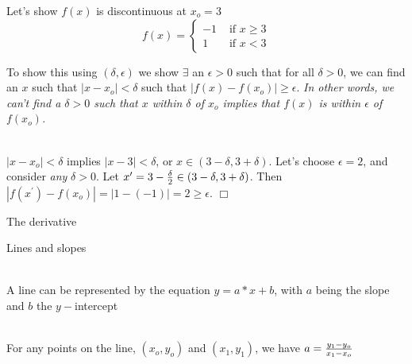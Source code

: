 \documentclass[10pt]{seminar}
\begin{document}
\newtheorem{proposition}{Proposition}

\newtheorem{definition}{Definition}

\newtheorem{corollary}{Corollary}

\newtheorem{theorem}{Theorem}

\newtheorem{lemma}{Lemma}

\def\argmax{\mathop{\rm argmax}\limits}  



\sffamily 

\begin{slide}

 
 Let's show $f(x)$ is discontinuous at $x_o=3$
\begin{equation*}
 f(x)=\left\{ 
 \begin{array}{cc}
-1&\text{ if }x\geq 3\\
1 &\text{ if }x<3
 \end{array}
\right.
\end{equation*}
 
To show this using $(\delta, \epsilon)$ we show $\exists$ an $\epsilon>0$ such that for all $\delta>0$, we can find an $x$ such that $|x-x_o|<\delta$ such that $|f(x)-f(x_o)|\geq\epsilon$.  \textit{In other words, we can't find a $\delta>0$ such that $x$ within $\delta$ of $x_o$ implies that $f(x)$ is within $\epsilon $ of $f(x_o)$.}

\ \\ $|x-x_o|<\delta$ implies $|x-3|<\delta$, or $x\in (3-\delta, 3+\delta)$. Let's choose $\epsilon=2$, and consider \textit{any} $\delta>0$. Let $x^\prime=3-{\delta\over 2}\in (3-\delta, 3+\delta)$.  Then  $|f(x^\prime)-f(x_o)|=|1-(-1)|=2\geq \epsilon$. $\Box$




\newslide

\begin{center}

The derivative
 \end{center}
 
 \newslide
 
Lines and slopes

\ \\A line can be represented by the equation $y=a*x+b$, with $a$ being the slope and $b$ the $y-$intercept

\ \\For any points on the line, $(x_o, y_o)$ and $(x_1, y_1)$, we have $a={{y_1-y_o}\over{x_1-x_o}}$

\begin{center}
\end{center}


\end{slide}
\end{document}
